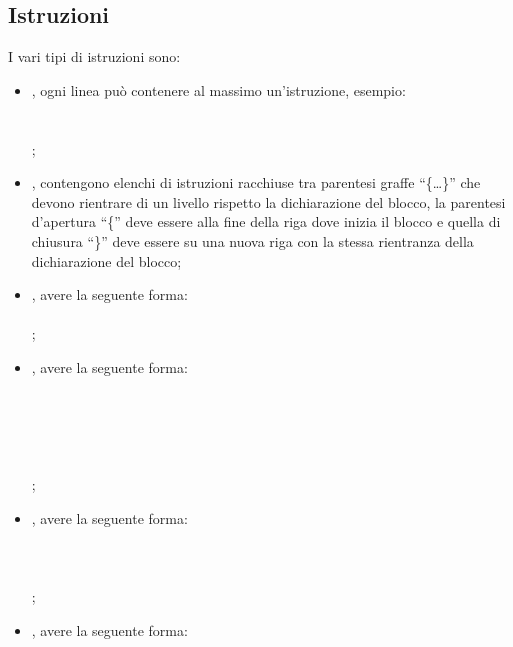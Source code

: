 \subsection{Istruzioni}
I vari tipi di istruzioni sono:
\begin{itemize}
  \item {}, ogni linea pu\`o contenere al massimo un'istruzione,
  esempio:\\ 
  \hspace*{0.5cm} \\
  \hspace*{0.5cm} \\ ;
  \item {}, contengono elenchi di istruzioni racchiuse tra parentesi
  graffe ``\{\ldots\}'' che devono rientrare di un livello rispetto la
  dichiarazione del blocco, la parentesi d'apertura ``\{'' deve essere alla fine
  della riga dove inizia il blocco e quella di chiusura ``\}'' deve essere su
  una nuova riga con la stessa rientranza della dichiarazione del blocco;
  \item {}, avere la seguente forma: \\
  \hspace*{0.5cm} \\ ;
  \item {}, avere la seguente forma: \\
  \hspace*{0.5cm} \\ 
  \hspace*{1.5cm} \\ 
  \hspace*{0.5cm} \\ 
  \hspace*{1.5cm} \\
  \hspace*{0.5cm} \co{\}}\\ ;
  \item {}, avere la seguente forma:\\
  \hspace*{0.5cm} \\ 
  \hspace*{1.5cm} \\ 
  \hspace*{0.5cm} \co{\}}\\ ;
  \item {}, avere la seguente forma: \\

\end{itemize}
